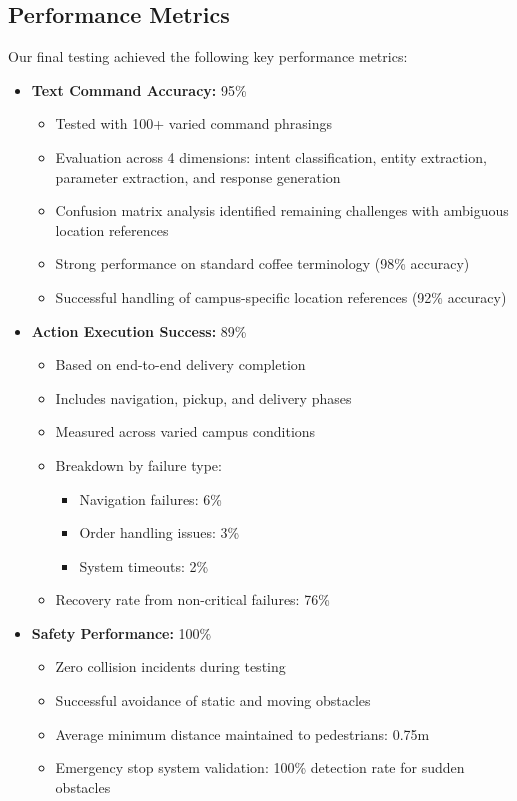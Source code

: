 \documentclass[12pt]{article}
\begin{document}
\subsection{Performance Metrics}

Our final testing achieved the following key performance metrics:

\begin{itemize}
    \item \textbf{Text Command Accuracy:} 95\%
    \begin{itemize}
        \item Tested with 100+ varied command phrasings
        \item Evaluation across 4 dimensions: intent classification, entity extraction, parameter extraction, and response generation
        \item Confusion matrix analysis identified remaining challenges with ambiguous location references
        \item Strong performance on standard coffee terminology (98\% accuracy)
        \item Successful handling of campus-specific location references (92\% accuracy)
    \end{itemize}
    
    \item \textbf{Action Execution Success:} 89\%
    \begin{itemize}
        \item Based on end-to-end delivery completion
        \item Includes navigation, pickup, and delivery phases
        \item Measured across varied campus conditions
        \item Breakdown by failure type:
        \begin{itemize}
            \item Navigation failures: 6\%
            \item Order handling issues: 3\%
            \item System timeouts: 2\%
        \end{itemize}
        \item Recovery rate from non-critical failures: 76\%
    \end{itemize}
    
    \item \textbf{Safety Performance:} 100\%
    \begin{itemize}
        \item Zero collision incidents during testing
        \item Successful avoidance of static and moving obstacles
        \item Average minimum distance maintained to pedestrians: 0.75m
        \item Emergency stop system validation: 100\% detection rate for sudden obstacles
    \end{itemize}
    

\end{itemize}
\end{document}
